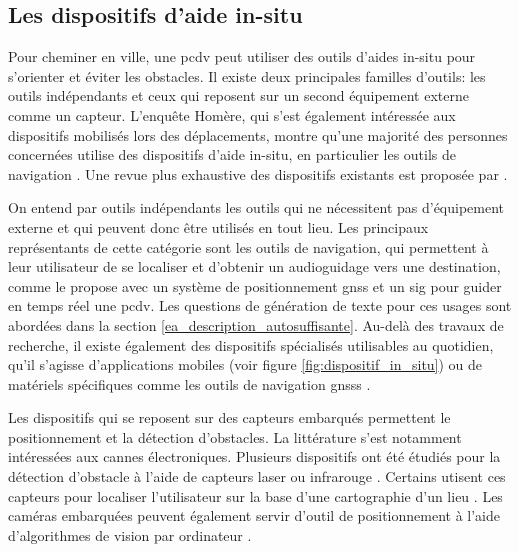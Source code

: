 \subsection{Les dispositifs d'aide in-situ}

\label{ea_dispositifs_in_situ}


Pour cheminer en ville, une \gls{pcdv} peut utiliser des outils d'aides in-situ pour s'orienter et éviter les obstacles. Il existe deux principales familles d'outils: les outils indépendants et ceux qui reposent sur un second équipement externe comme un capteur. L'enquête Homère, qui s'est également intéressée aux dispositifs mobilisés lors des déplacements, montre qu'une majorité des personnes concernées utilise des dispositifs d'aide in-situ, en particulier les outils de navigation \citep{homere_2023}. Une revue plus exhaustive des dispositifs existants est proposée par \citet{Kuriakose2022}.

\newpar{}

On entend par outils indépendants les outils qui ne nécessitent pas d'équipement externe et qui peuvent donc être utilisés en tout lieu. Les principaux représentants de cette catégorie sont les outils de navigation, qui permettent à leur utilisateur de se localiser et d'obtenir un audioguidage vers une destination, comme le propose \citet{Golledge1998} avec un système de positionnement \gls{gnss} et un \gls{sig} pour guider en temps réel une \gls{pcdv}. Les questions de génération de texte pour ces usages sont abordées dans la section \ref{ea_description_autosuffisante}. Au-delà des travaux de recherche, il existe également des dispositifs spécialisés utilisables au quotidien, qu'il s'agisse d'applications mobiles (voir figure \ref{fig:dispositif_in_situ}) ou de matériels spécifiques comme les outils de navigation \glspl{gnss} \citep{Refuveille2012}. 

\newpar{}

Les dispositifs qui se reposent sur des capteurs embarqués permettent le positionnement et la détection d'obstacles. La littérature s'est notamment intéressées aux cannes électroniques. Plusieurs dispositifs ont été étudiés pour la détection d'obstacle à l'aide de capteurs laser ou infrarouge \citep{Damaschini2005}. Certains utisent ces capteurs pour localiser l'utilisateur sur la base d'une cartographie d'un lieu \citep{Connier2018}. Les caméras embarquées peuvent également servir d'outil de positionnement à l'aide d'algorithmes de vision par ordinateur \citep{Duh2021}.

